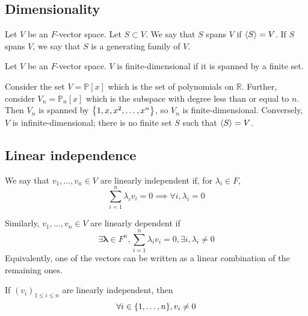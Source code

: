 \subsection{Dimensionality}
\begin{definition}
	Let \( V \) be an \( F \)-vector space.
	Let \( S \subset V \).
	We say that \( S \) spans \( V \) if \( \langle{} S \rangle = V \).
	If \( S \) spans \( V \), we say that \( S \) is a generating family of \( V \).
\end{definition}

\begin{definition}
	Let \( V \) be an \( F \)-vector space.
	\( V \) is finite-dimensional if it is spanned by a finite set.
\end{definition}
\begin{example}
	Consider the set \( V = \mathbb P[x] \) which is the set of polynomials on \( \mathbb R \).
	Further, consider \( V_n = \mathbb P_n[x] \) which is the subspace with degree less than or equal to \( n \).
	Then \( V_n \) is spanned by \( \qty{1, x, x^2, \dots, x^n} \), so \( V_n \) is finite-dimensional.
	Conversely, \( V \) is infinite-dimensional; there is no finite set \( S \) such that \( \langle{} S \rangle = V \).
\end{example}

\subsection{Linear independence}
\begin{definition}
	We say that \( v_1, \dots, v_n \in V \) are linearly independent if, for \( \lambda_i \in F \),
	\[
		\sum_{i=1}^n \lambda_i v_i = 0 \implies \forall i, \lambda_i = 0
	\]
\end{definition}
\begin{definition}
	Similarly, \( v_1, \dots, v_n \in V \) are linearly dependent if
	\[
		\exists \bm \lambda \in F^n, \sum_{i=1}^n \lambda_i v_i = 0, \exists i, \lambda_i \neq 0
	\]
	Equivalently, one of the vectors can be written as a linear combination of the remaining ones.
\end{definition}
\begin{remark}
	If \( (v_i)_{1 \leq i \leq n} \) are linearly independent, then
	\[
		\forall i \in \qty{1,\dots,n}, v_i \neq 0
	\]
\end{remark}

